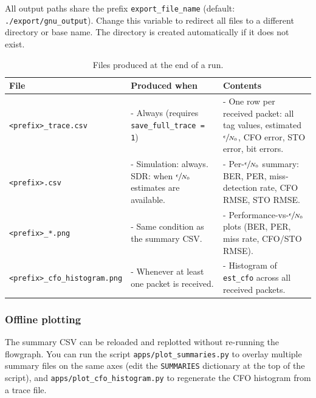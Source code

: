 All output paths share the prefix \texttt{export\_file\_name} (default: \texttt{./export/gnu\_output}). Change this variable to redirect all files to a different directory or base name. The directory is created automatically if it does not exist.

\begin{table}[H]
\centering
\caption{Files produced at the end of a run.}
\begin{tabularx}{\linewidth}{>{\small\raggedright\arraybackslash}p{5.2cm} >{\small\raggedright\arraybackslash}p{4.6cm} >{\small\raggedright\arraybackslash}X}
\toprule
\textbf{File} & \textbf{Produced when} & \textbf{Contents} \\
\midrule
\texttt{<prefix>\_trace.csv} & -  Always (requires \texttt{save\_full\_trace = 1}) & -  One row per received packet: all tag values, estimated $\sfrac{\epsilon}{N_0}$, CFO error,   STO error, bit errors. \\[4pt]
\texttt{<prefix>.csv} & -  Simulation: always. SDR: when $\sfrac{\epsilon}{N_0}$ estimates are available. & -  Per-$\sfrac{\epsilon}{N_0}$ summary: BER, PER, miss-detection rate, CFO RMSE, STO RMSE. \\[4pt]
\texttt{<prefix>\_*.png} & -  Same condition as the summary CSV. & -  Performance-vs-$\sfrac{\epsilon}{N_0}$ plots (BER, PER, miss rate, CFO/STO RMSE). \\[4pt]
\texttt{<prefix>\_cfo\_histogram.png} & -  Whenever at least one packet is received. & -  Histogram of \texttt{est\_cfo} across all received packets. \\
\bottomrule
\end{tabularx}
\end{table}

\subsubsection{Offline plotting}
The summary CSV can be reloaded and replotted without re-running the flowgraph. You can run the script \texttt{apps/plot\_summaries.py} to overlay multiple summary files on the same axes (edit the \texttt{SUMMARIES} dictionary at the top of the script), and \texttt{apps/plot\_cfo\_histogram.py} to regenerate the CFO histogram from a trace file.
